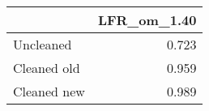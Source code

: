 \begin{tabular}{lr}
\toprule
{} & LFR_om_1.40 \\
\midrule
Uncleaned   &       0.723 \\
Cleaned old &       0.959 \\
Cleaned new &       0.989 \\
\bottomrule
\end{tabular}
